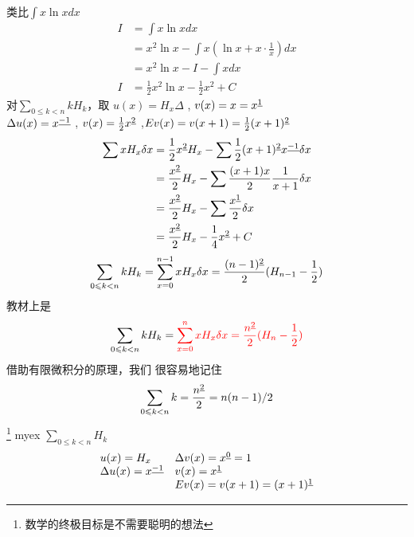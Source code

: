 类比$ \int x\ln{x} dx $ 
\begin{align*}
    I &= \int x\ln{x} dx \\
    &= x^2 \ln{x} - \int x(\ln{x}+x\cdot \frac{1}{x})dx\\
    &= x^2 \ln{x} - I - \int xdx\\
    I &= \frac{1}{2}x^2 \ln{x} - \frac{1}{2}x^2 + C
\end{align*}
对$ \sum_{0\leqslant k< n} k H_k $，取 $ u(x)=H_x \Delta $ , $ v(x)=x = x^{\underline{1}}$\\
$ \Delta u(x) = x^{\underline{-1}} $ , $ v(x) = \frac{1}{2}x^{\underline{2}} $ ,$ Ev(x) = v(x+1)=\frac{1}{2}(x+1)^{\underline{2}} $ 
\begin{align*}
    \sum x H_x \delta x
    &= \frac{1}{2}x^{\underline{2}}H_x - \sum \frac{1}{2}(x+1)^{\underline{2}}x^{\underline{-1}} \delta x\\
    &= \frac{x^{\underline{2}}}{2}H_x - \sum \frac{(x+1)x}{2} \frac{1}{x+1} \delta x\\
    &= \frac{x^{\underline{2}}}{2}H_x - \sum \frac{x^{\underline{1}}}{2}\delta x\\
    &= \frac{x^{\underline{2}}}{2}H_x - \frac{1}{4}x^{\underline{2}}+C
\end{align*}
\begin{equation*}
    \sum_{0\leqslant k< n} k H_k 
    = \sum_{x=0}^{n-1}x H_x \delta x = \frac{(n-1)^{\underline{2}}}{2}(H_{n-1}-\frac{1}{2})
\end{equation*}
教材上是
\begin{equation*}
    \sum_{0\leqslant k< n} k H_k 
    = {\color{red}\sum_{x=0}^{n}x H_x \delta x = \frac{n^{\underline{2}}}{2}(H_{n}-\frac{1}{2})}
\end{equation*}
{\color{blue}借助有限微积分的原理，我们
很容易地记住}
\begin{equation}
    \sum_{0\leqslant k<n}k = \frac{n^{\underline{2}}}{2} = n(n-1)/2
\end{equation}
\footnote{数学的终极目标是不需要聪明的想法}
myex $ \sum_{0\leqslant k < n}H_k $ 
\begin{equation*}
    \begin{array}{ll}
        u(x) = H_x & \Delta v(x) = x^{\underline{0}}=1 \\
        \Delta u(x) = x^{\underline{-1}} & v(x) = x^{\underline{1}} \\
        & E v(x) = v(x+1) = (x+1)^{\underline{1}}\\
    \end{array}
\end{equation*}
